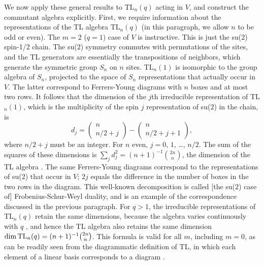 \documentclass[twocolumn,floats,pra]{revtex4}
\newcommand {\be}{\begin{equation}}
\newcommand {\ee} {\end{equation}}
\begin{document}
We now apply these general results to TL$_n(q)$ acting in $V$, and
construct the commutant algebra explicitly. First, we require
information about the representations of the TL algebra TL$_n(q)$
(in this paragraph, we allow $n$ to be odd or even). The $m=2$
($q=1$) case of $V$ is instructive. This is just the su($2$)
spin-1/2 chain. The su($2$) symmetry commutes with permutations of
the sites, and the TL generators are essentially the
transpositions of neighbors, which generate the symmetric group
$S_n$ on $n$ sites. TL$_n(1)$ is isomorphic to the group algebra
of $S_n$, projected to the space of $S_n$ representations that
actually occur in $V$. The latter correspond to Ferrers-Young
diagrams with $n$ boxes and at most two rows. It follows that the
dimension of the $j$th irreducible representation of TL$_n(1)$,
which is the
multiplicity of the spin $j$ representation of su($2$) in the chain, is%
\be d_j=\left(\begin{array}{c}n\\ n/2+j
\end{array}\right)-\left(\begin{array}{c}n\\ n/2+j+1
\end{array}\right),\label{tldims}\ee
where $n/2+j$ must be an integer. For $n$ even, $j=0$, $1$,
\ldots, $n/2$. The sum of the squares of these dimensions is
$\sum_j d_j^2= (n+1)^{-1}{2n\choose n}$, the dimension of the TL
algebra \cite{ghj}. The same Ferrers-Young diagrams correspond to
the representations of su($2$) that occur in $V$; $2j$ equals the
difference in the number of boxes in the two rows in the diagram.
This well-known decomposition is called [the su($2$) case of]
Frobenius-Schur-Weyl duality, and is an example of the
correspondence discussed in the previous paragraph. For $q>1$, the
irreducible representations of TL$_n(q)$ retain the same
dimensions, because the algebra varies continuously with $q$
\cite{jones1,ghj,martin}, and hence the TL algebra also retains
the same dimension ${\rm dim}\,{\rm TL}_n(q)=(n+1)^{-1}{2n\choose
n}$. This formula is valid for all $m$, including $m=0$, as can be
readily seen from the diagrammatic definition of TL, in which each
element of a linear basis corresponds to a diagram
\cite{jones1,ghj,martin}.
\end{document}
